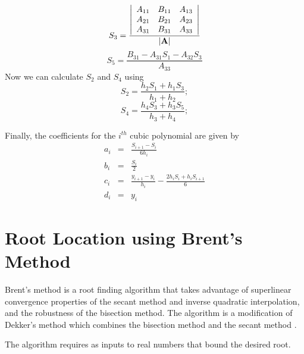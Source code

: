 %
\begin{equation}
    S_3 = \frac{
    \left|%
    \begin{array}{ccc}
       A_{11} & B_{11} & A_{13} \\
       A_{21} & B_{21} & A_{23} \\
       A_{31} & B_{31} & A_{33} \\
    \end{array}%
    \right|
    }
    {\mathbf{| \mathbf{A}|}}
\end{equation}
%
\begin{equation}
     S_5 = \frac{B_{31} - A_{31} S_1 - A_{32} S_3}{A_{33}}
\end{equation}
%
Now we can calculate $S_2$ and $S_4$ using
%
\begin{equation}
     S_2 = \frac{ h_2 S_1 + h_1 S_3  }{  h_1 + h_2 };
\end{equation}
%
\begin{equation}
     S_4 = \frac{ h_4 S_3 + h_3 S_5  }{  h_3 + h_4 };
\end{equation}
%

Finally, the coefficients for the $i^{th}$ cubic polynomial are
given by
\begin{eqnarray}
   a_i &=&  \frac{ S_{i+1} - S_i   }{ 6  h_i}\\
   b_i &=&  \frac{S_i}{2}\\
   c_i &=&  \frac{ y_{i+1} - y_i  }{ h_i } - \frac{ 2 h_i S_i + h_i S_{i+1} }{  6
   }\\
   d_i &=&  y_i
\end{eqnarray}


\section{Root Location using Brent's Method}

Brent's\cite{Brent:73} method is a root finding algorithm that takes
advantage of superlinear convergence properties of the secant method
and inverse quadratic interpolation, and the robustness of the
bisection method.  The algorithm is a modification of Dekker's
method which combines the bisection method and the secant method
\cite{Dekker:69}.

The algorithm requires as inputs to real numbers that bound the
desired root.


